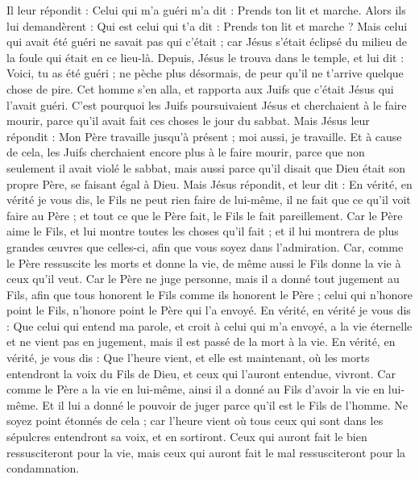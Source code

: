 \begin{multicols}{2}
Il leur répondit : Celui qui m'a guéri m'a dit : Prends ton lit et marche.
Alors ils lui demandèrent : Qui est celui qui t'a dit : Prends ton lit et marche ?
Mais celui qui avait été guéri ne savait pas qui c'était ; car Jésus s'était éclipsé du milieu de la foule qui était en ce lieu-là.
Depuis, Jésus le trouva dans le temple, et lui dit : Voici, tu as été guéri ; ne pèche plus désormais, de peur qu'il ne t'arrive quelque chose de pire.
Cet homme s'en alla, et rapporta aux Juifs que c'était Jésus qui l'avait guéri.
C'est pourquoi les Juifs poursuivaient Jésus et cherchaient à le faire mourir, parce qu'il avait fait ces choses le jour du sabbat.
Mais Jésus leur répondit : Mon Père travaille jusqu'à présent ; moi aussi, je travaille.
Et à cause de cela, les Juifs cherchaient encore plus à le faire mourir, parce que non seulement il avait violé le sabbat, mais aussi parce qu'il disait que Dieu était son propre Père, se faisant égal à Dieu.
Mais Jésus répondit, et leur dit : En vérité, en vérité je vous dis, le Fils ne peut rien faire de lui-même, il ne fait que ce qu'il voit faire au Père ; et tout ce que le Père fait, le Fils le fait pareillement.
Car le Père aime le Fils, et lui montre toutes les choses qu'il fait ; et il lui montrera de plus grandes œuvres que celles-ci, afin que vous soyez dans l'admiration.
Car, comme le Père ressuscite les morts et donne la vie, de même aussi le Fils donne la vie à ceux qu'il veut.
Car le Père ne juge personne, mais il a donné tout jugement au Fils,
afin que tous honorent le Fils comme ils honorent le Père ; celui qui n'honore point le Fils, n'honore point le Père qui l'a envoyé.
En vérité, en vérité je vous dis : Que celui qui entend ma parole, et croit à celui qui m'a envoyé, a la vie éternelle et ne vient pas en jugement, mais il est passé de la mort à la vie.
En vérité, en vérité, je vous dis : Que l'heure vient, et elle est maintenant, où les morts entendront la voix du Fils de Dieu, et ceux qui l'auront entendue, vivront.
Car comme le Père a la vie en lui-même, ainsi il a donné au Fils d'avoir la vie en lui-même.
Et il lui a donné le pouvoir de juger parce qu'il est le Fils de l'homme.
Ne soyez point étonnés de cela ; car l'heure vient où tous ceux qui sont dans les sépulcres entendront sa voix, et en sortiront.
 Ceux qui auront fait le bien ressusciteront pour la vie, mais ceux qui auront fait le mal ressusciteront pour la condamnation.

\end{multicols}
